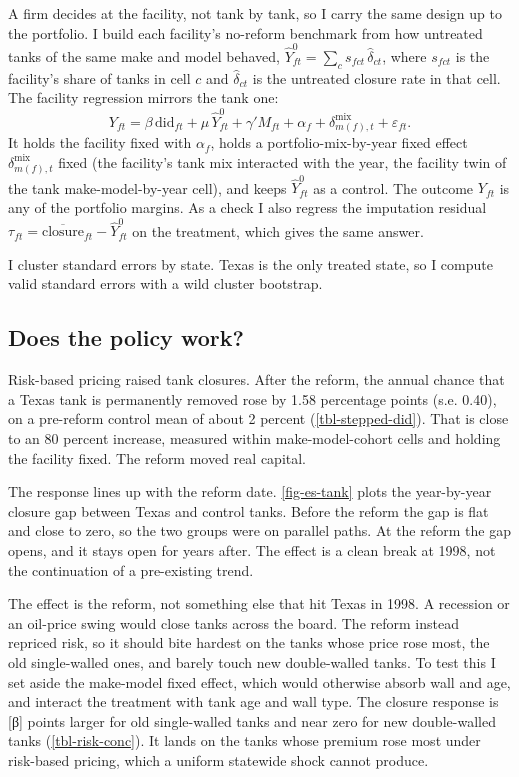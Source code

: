 \documentclass[
  12pt,
]{article}
\begin{document}
A firm decides at the facility, not tank by tank, so I carry the same
design up to the portfolio. I build each facility's no-reform benchmark
from how untreated tanks of the same make and model behaved,
\(\hat Y^0_{ft}=\sum_c s_{fct}\,\hat\delta_{ct}\), where \(s_{fct}\) is
the facility's share of tanks in cell \(c\) and \(\hat\delta_{ct}\) is
the untreated closure rate in that cell. The facility regression mirrors
the tank one:
\[Y_{ft}=\beta\,\text{did}_{ft}+\mu\,\hat Y^0_{ft}+\gamma'M_{ft}+\alpha_f+\delta^{\text{mix}}_{m(f),t}+\varepsilon_{ft}.\]
It holds the facility fixed with \(\alpha_f\), holds a
portfolio-mix-by-year fixed effect \(\delta^{\text{mix}}_{m(f),t}\)
fixed (the facility's tank mix interacted with the year, the facility
twin of the tank make-model-by-year cell), and keeps \(\hat Y^0_{ft}\)
as a control. The outcome \(Y_{ft}\) is any of the portfolio margins. As
a check I also regress the imputation residual
\(\tau_{ft}=\overline{\text{closure}}_{ft}-\hat Y^0_{ft}\) on the
treatment, which gives the same answer.

I cluster standard errors by state. Texas is the only treated state, so
I compute valid standard errors with a wild cluster bootstrap.

\subsection{Does the policy work?}\label{does-the-policy-work}

Risk-based pricing raised tank closures. After the reform, the annual
chance that a Texas tank is permanently removed rose by 1.58 percentage
points (s.e. 0.40), on a pre-reform control mean of about 2 percent
(\autoref{tbl-stepped-did}). That is close to an 80 percent increase,
measured within make-model-cohort cells and holding the facility fixed.
The reform moved real capital.

The response lines up with the reform date. \autoref{fig-es-tank} plots
the year-by-year closure gap between Texas and control tanks. Before the
reform the gap is flat and close to zero, so the two groups were on
parallel paths. At the reform the gap opens, and it stays open for years
after. The effect is a clean break at 1998, not the continuation of a
pre-existing trend.

The effect is the reform, not something else that hit Texas in 1998. A
recession or an oil-price swing would close tanks across the board. The
reform instead repriced risk, so it should bite hardest on the tanks
whose price rose most, the old single-walled ones, and barely touch new
double-walled tanks. To test this I set aside the make-model fixed
effect, which would otherwise absorb wall and age, and interact the
treatment with tank age and wall type. The closure response is {[}β{]}
points larger for old single-walled tanks and near zero for new
double-walled tanks (\autoref{tbl-risk-conc}). It lands on the tanks
whose premium rose most under risk-based pricing, which a uniform
statewide shock cannot produce.
\end{document}
